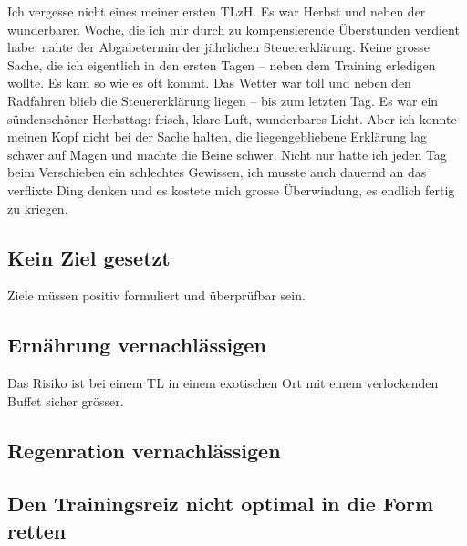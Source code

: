 \documentclass[a4paper,DIV13,BCOR0cm]{scrartcl}
\newcommand{\tlzh}{TLzH}
\begin{document}
Ich vergesse nicht eines meiner ersten \tlzh{}. Es war Herbst und neben der wunderbaren Woche,
die ich mir durch zu kompensierende Überstunden verdient habe, nahte der Abgabetermin der jährlichen Steuererklärung.
Keine grosse Sache, die ich eigentlich in den ersten Tagen -- neben dem Training erledigen wollte.
Es kam so wie es oft kommt. Das Wetter war toll und neben den Radfahren blieb die Steuererklärung liegen -- bis zum letzten Tag.
Es war ein sündenschöner Herbsttag: frisch, klare Luft, wunderbares Licht.
Aber ich konnte meinen Kopf nicht bei der Sache halten, die liegengebliebene Erklärung lag schwer auf Magen und machte die Beine schwer.
Nicht nur hatte ich jeden Tag beim Verschieben ein schlechtes Gewissen,
ich musste auch dauernd an das verflixte Ding denken und es kostete mich grosse Überwindung, es endlich fertig zu kriegen.

\subsection{Kein Ziel gesetzt}

Ziele müssen positiv formuliert und überprüfbar sein.

\subsection{Ernährung vernachlässigen}

Das Risiko ist bei einem TL in einem exotischen Ort mit einem verlockenden Buffet sicher grösser.

\subsection{Regenration vernachlässigen}

\subsection{Den Trainingsreiz nicht optimal in die Form retten}




\end{document}
